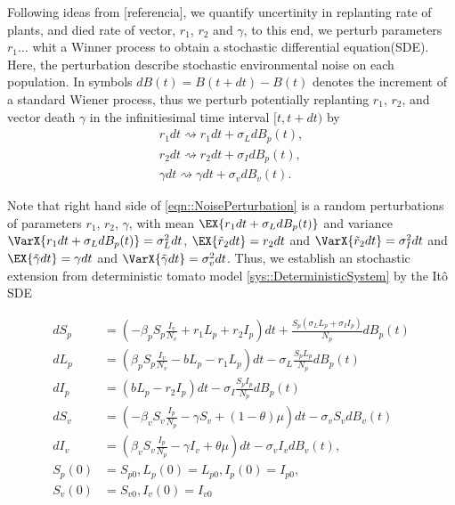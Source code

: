 %
Following ideas from [referencia], we quantify uncertinity in replanting rate of
plants, and  died rate of vector, $r_1$, $r_2$ and $\gamma$, to this end, we
perturb parameters   $r_1 \dots$ whit a Winner
process to obtain a stochastic differential equation(SDE). Here, the 
perturbation describe stochastic environmental noise on each population. In
symbols $ dB(t)=B(t+dt)-B(t)$ denotes the increment of a standard Wiener
process, thus we perturb potentially replanting $r_1$, $r_2$, and vector death
$\gamma$ in the infinitiesimal time interval $[t, t + dt)$ by
\begin{equation}
	\label{eqn::NoisePerturbation}
	\begin{aligned}
		{r}_1 dt \rightsquigarrow r_1 dt + \sigma_L dB_p(t),
		\\
		{r}_2 dt \rightsquigarrow r_2 dt + \sigma_I dB_p(t),
		\\
		\gamma dt \rightsquigarrow \gamma dt + \sigma_v dB_v(t).
	\end{aligned}
\end{equation}

	Note that right hand side of \autoref{eqn::NoisePerturbation}
	is a random perturbations of parameters
$r_1$, $r_2$, $\gamma$, with mean
$
	\EX{r_1 dt + \sigma_L dB_p(t)}
$
and variance 
$
	\VarX{r_1 dt + \sigma_L dB_p(t)} = \sigma_L^2dt
$, 
$
	\EX{\tilde{r}_2dt} = r_2dt
$ 
and
$
	\VarX{\tilde{r}_2dt} = \sigma_I^2dt
$ 
and 
$
	\EX{\tilde{\gamma}dt} = \gamma dt
$ and 
$
	\VarX{\tilde{\gamma}dt} = \sigma_v^2dt
$.
%
Thus, we establish an stochastic extension from deterministic tomato model 
\autoref{sys::DeterministicSystem} by the It\^{o} SDE

\begin{equation}
	\label{sys::StochasticSystem}
	\begin{aligned}
		d S_p &=
			\left(
				-\beta_p S_p \frac{I_v}{N_v} + r_1 L_p + r_2 I_p
			\right)dt 
			+ \frac{S_p(\sigma_L L_p
			+ 
			\sigma_I I_p)}{N_p}dB_p(t) 
		\\
		dL_p &=
			\left(
				\beta_p S_p \frac{I_v}{N_v} - b L_p - r_1 L_p
			\right) dt 
			- \sigma_L \frac{S_pL_p}{N_p} dB_p(t) 
		\\
		d I_p &=
			\left(
				b L_p - r_2 I_p
			\right) dt 
			- \sigma_I \frac{S_pI_p}{N_p} dB_p(t) 
		\\
		dS_v &=
			\left(
				-\beta_v S_v \frac{I_p}{N_p} - \gamma S_v  + (1-\theta) \mu
			\right)dt - \sigma_v S_v dB_v(t) 
		\\
		d I_v &=
			\left(
				\beta_v S_v \frac{I_p}{N_p} -\gamma I_v + \theta \mu
			\right) dt 
			- \sigma_v I_v dB_v(t),
			 \\
			S_p(0) &=S_{p0}, 
            L_p(0) = L_{p0},
            I_p(0) = I_{p0},
            \\
             S_v(0) &= S_{v0},
              I_v(0) = I_{v0}
	\end{aligned}
\end{equation}
